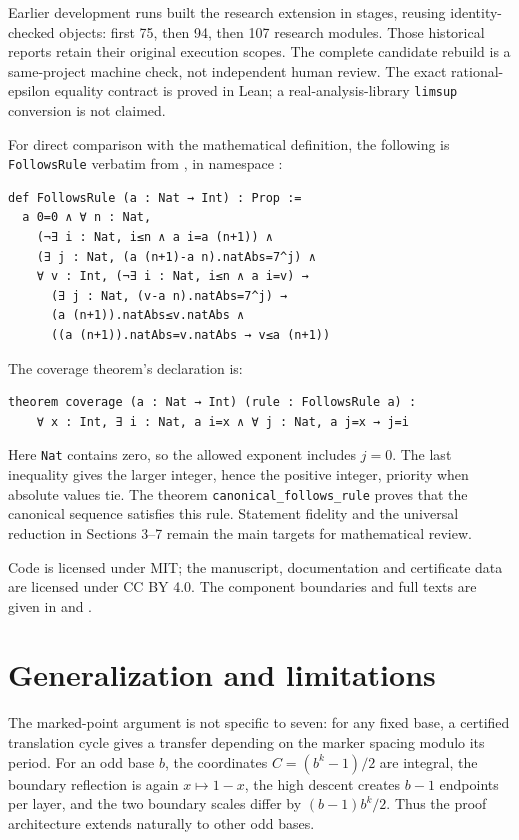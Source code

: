\documentclass[11pt,a4paper]{article}
\begin{document}
Earlier development runs built the research extension in stages, reusing
identity-checked objects: first 75, then 94, then 107 research modules.
Those historical reports retain their original execution scopes. The
complete candidate rebuild is a same-project machine check, not independent
human review. The exact rational-epsilon equality contract is proved in Lean;
a real-analysis-library \texttt{limsup} conversion is not claimed.

For direct comparison with the mathematical definition, the following is
\texttt{FollowsRule} verbatim from ,
in namespace :
\begin{lstlisting}
def FollowsRule (a : Nat → Int) : Prop :=
  a 0=0 ∧ ∀ n : Nat,
    (¬∃ i : Nat, i≤n ∧ a i=a (n+1)) ∧
    (∃ j : Nat, (a (n+1)-a n).natAbs=7^j) ∧
    ∀ v : Int, (¬∃ i : Nat, i≤n ∧ a i=v) →
      (∃ j : Nat, (v-a n).natAbs=7^j) →
      (a (n+1)).natAbs≤v.natAbs ∧
      ((a (n+1)).natAbs=v.natAbs → v≤a (n+1))
\end{lstlisting}
The coverage theorem's declaration is:
\begin{lstlisting}
theorem coverage (a : Nat → Int) (rule : FollowsRule a) :
    ∀ x : Int, ∃ i : Nat, a i=x ∧ ∀ j : Nat, a j=x → j=i
\end{lstlisting}
Here \texttt{Nat} contains zero, so the allowed exponent includes $j=0$.
The last inequality gives the larger integer, hence the positive integer,
priority when absolute values tie. The theorem
\texttt{canonical\_follows\_rule} proves that the canonical sequence
satisfies this rule. Statement fidelity and the universal reduction in
Sections 3--7 remain the main targets for mathematical review.

Code is licensed under MIT; the manuscript, documentation and certificate
data are licensed under CC BY 4.0. The component boundaries and full texts
are given in  and .

\section{Generalization and limitations}
\label{sec:11}

The marked-point argument is not specific to seven: for any fixed base, a certified translation cycle gives a transfer depending on the marker spacing modulo its period. For an odd base $b$, the coordinates $C=(b^k-1)/2$ are integral, the boundary reflection is again $x\mapsto1-x$, the high descent creates $b-1$ endpoints per layer, and the two boundary scales differ by $(b-1)b^k/2$. Thus the proof architecture extends naturally to other odd bases.
\end{document}
